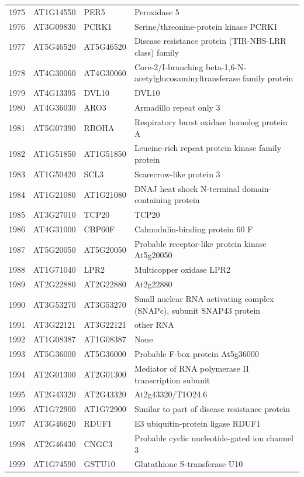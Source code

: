 \documentclass[11pt]{article}
\begin{document}
\begin{center}
\begin{tabular}{rlll}
1975 & AT1G14550 & PER5 & Peroxidase 5\\
1976 & AT3G09830 & PCRK1 & Serine/threonine-protein kinase PCRK1\\
1977 & AT5G46520 & AT5G46520 & Disease resistance protein (TIR-NBS-LRR class) family\\
1978 & AT4G30060 & AT4G30060 & Core-2/I-branching beta-1,6-N-acetylglucosaminyltransferase family protein\\
1979 & AT4G13395 & DVL10 & DVL10\\
1980 & AT4G36030 & ARO3 & Armadillo repeat only 3\\
1981 & AT5G07390 & RBOHA & Respiratory burst oxidase homolog protein A\\
1982 & AT1G51850 & AT1G51850 & Leucine-rich repeat protein kinase family protein\\
1983 & AT1G50420 & SCL3 & Scarecrow-like protein 3\\
1984 & AT1G21080 & AT1G21080 & DNAJ heat shock N-terminal domain-containing protein\\
1985 & AT3G27010 & TCP20 & TCP20\\
1986 & AT4G31000 & CBP60F & Calmodulin-binding protein 60 F\\
1987 & AT5G20050 & AT5G20050 & Probable receptor-like protein kinase At5g20050\\
1988 & AT1G71040 & LPR2 & Multicopper oxidase LPR2\\
1989 & AT2G22880 & AT2G22880 & At2g22880\\
1990 & AT3G53270 & AT3G53270 & Small nuclear RNA activating complex (SNAPc), subunit SNAP43 protein\\
1991 & AT3G22121 & AT3G22121 & other RNA\\
1992 & AT1G08387 & AT1G08387 & None\\
1993 & AT5G36000 & AT5G36000 & Probable F-box protein At5g36000\\
1994 & AT2G01300 & AT2G01300 & Mediator of RNA polymerase II transcription subunit\\
1995 & AT2G43320 & AT2G43320 & At2g43320/T1O24.6\\
1996 & AT1G72900 & AT1G72900 & Similar to part of disease resistance protein\\
1997 & AT3G46620 & RDUF1 & E3 ubiquitin-protein ligase RDUF1\\
1998 & AT2G46430 & CNGC3 & Probable cyclic nucleotide-gated ion channel 3\\
1999 & AT1G74590 & GSTU10 & Glutathione S-transferase U10\\

\end{tabular}
\end{center}
\end{document}
